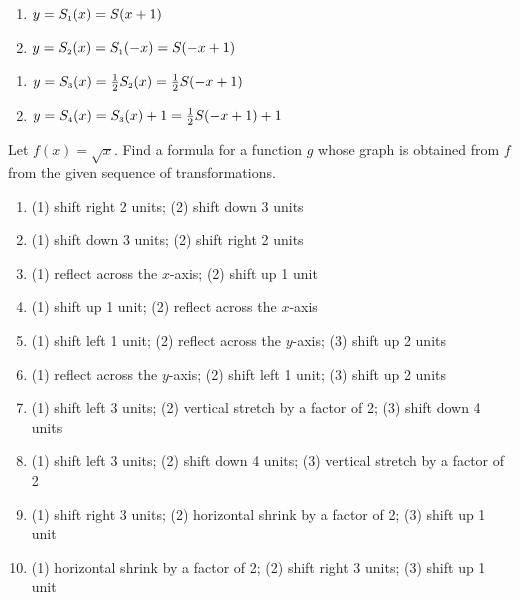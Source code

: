 \begin{multicols}{2}
\begin{enumerate}
\setcounter{enumi}{\value{HW}}

\item $y = S_{\text{\tiny $1$}}(x) = S(x + 1)$ \label{transformsinegraphfirst}
\item  $y = S_{\text{\tiny $2$}}(x) =  S_{\text{\tiny $1$}}(-x) = S(-x + 1)$

\setcounter{HW}{\value{enumi}}
\end{enumerate}
\end{multicols}

\begin{multicols}{2}
\begin{enumerate}
\setcounter{enumi}{\value{HW}}

\item  $y = S_{\text{\tiny $3$}}(x) = \frac{1}{2}  S_{\text{\tiny $2$}}(x) =  \frac{1}{2}S(-x+1)$
\item  $y = S_{\text{\tiny $4$}}(x) = S_{\text{\tiny $3$}}(x) + 1 = \frac{1}{2}S(-x+1) + 1$ \label{transformsinegraphlast}

\setcounter{HW}{\value{enumi}}
\end{enumerate}
\end{multicols}

Let $f(x) = \sqrt{x}$.  Find a formula for a function $g$ whose graph is obtained from $f$ from the given sequence of transformations. 

\begin{enumerate}
\setcounter{enumi}{\value{HW}}


\item  (1) shift right 2 units; (2) shift down 3 units

\item  (1) shift down 3 units; (2) shift right 2 units

\item  (1) reflect across the $x$-axis; (2) shift up 1 unit

\item  (1) shift up 1 unit; (2) reflect across the $x$-axis

\item  (1) shift left 1 unit; (2) reflect across the $y$-axis; (3) shift up 2 units

\item  (1) reflect across the $y$-axis;  (2) shift left 1 unit;  (3) shift up 2 units

\item  (1) shift left 3 units; (2) vertical stretch by a factor of 2; (3) shift down 4 units

\item  (1) shift left 3 units; (2) shift down 4 units; (3) vertical stretch by a factor of 2

\item  (1) shift right 3 units; (2) horizontal shrink by a factor of 2; (3) shift up 1 unit

\item  (1) horizontal shrink by a factor of 2; (2) shift right 3 units; (3) shift up 1 unit


\setcounter{HW}{\value{enumi}}
\end{enumerate}


